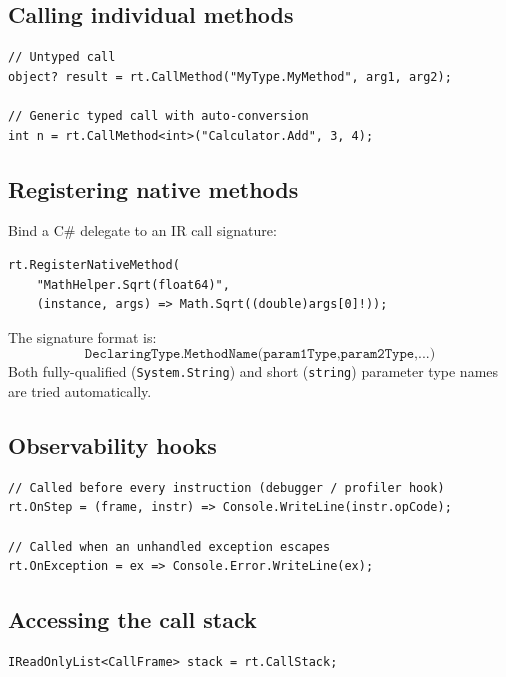 \documentclass[11pt,a4paper]{article}
\begin{document}
\subsection{Calling individual methods}

\begin{lstlisting}[language={[Sharp]C}]
// Untyped call
object? result = rt.CallMethod("MyType.MyMethod", arg1, arg2);

// Generic typed call with auto-conversion
int n = rt.CallMethod<int>("Calculator.Add", 3, 4);
\end{lstlisting}

\subsection{Registering native methods}

Bind a C\# delegate to an IR call signature:

\begin{lstlisting}[language={[Sharp]C}]
rt.RegisterNativeMethod(
    "MathHelper.Sqrt(float64)",
    (instance, args) => Math.Sqrt((double)args[0]!));
\end{lstlisting}

The signature format is:
\[
\texttt{DeclaringType.MethodName(param1Type,param2Type,...)}
\]
Both fully-qualified (\texttt{System.String}) and short (\texttt{string})
parameter type names are tried automatically.

\subsection{Observability hooks}

\begin{lstlisting}[language={[Sharp]C}]
// Called before every instruction (debugger / profiler hook)
rt.OnStep = (frame, instr) => Console.WriteLine(instr.opCode);

// Called when an unhandled exception escapes
rt.OnException = ex => Console.Error.WriteLine(ex);
\end{lstlisting}

\subsection{Accessing the call stack}

\begin{lstlisting}[language={[Sharp]C}]
IReadOnlyList<CallFrame> stack = rt.CallStack;
\end{lstlisting}
\end{document}

